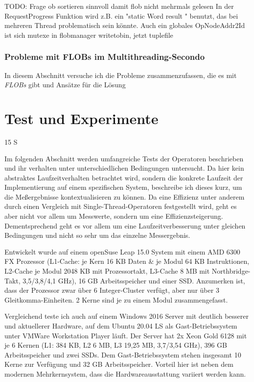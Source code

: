 \documentclass[a4paper,12pt,twoside]{article}
\newcommand{\Fb}[1]{\textit{#1}} %
\begin{document}
TODO: Frage ob sortieren sinnvoll damit flob nicht mehrmals gelesen
In der RequestProgress Funktion wird z.B. ein "static Word result " benutzt, das bei mehreren Thread problematisch sein könnte. 
Auch ein globales OpNodeAddr2Id ist sich
mutexe in flobmanager
writetobin, jetzt tuplefile

\subsubsection{Probleme mit FLOBs im Multithreading-Secondo}

In diesem Abschnitt versuche ich die Probleme zusammenzufassen, die es mit \Fb{FLOBs} gibt und Ansätze für die Lösung 

\section{Test und Experimente} 15 S

Im folgenden Abschnitt werden umfangreiche Tests der Operatoren beschrieben und ihr verhalten unter unterschiedlichen Bedingungen untersucht. Da hier kein abstraktes Laufzeitverhalten betrachtet wird, sondern die konkrete Laufzeit der Implementierung auf einem spezifischen System, beschreibe ich dieses kurz, um die Meßergebnisse kontextualisieren zu können. Da eine Effizienz unter anderem durch einen Vergleich mit Single-Thread-Operatoren festgestellt wird, geht es aber nicht vor allem um Messwerte, sondern um eine Effizienzsteigerung. Dementsprechend geht es vor allem um eine Laufzeitverbesserung unter gleichen Bedingungen und nicht so sehr um das einzelne Messergebnis.

Entwickelt wurde auf einem openSuse Leap 15.0 System mit einem AMD 6300 FX Prozessor (L1-Cache: je Kern 16 KB Daten \& je Modul 64 KB Instruktionen, L2-Cache je Modul 2048 KB mit Prozessortakt, L3-Cache 8 MB mit Northbridge-Takt, 3,5/3,8/4,1 GHz), 16 GB Arbeitsspeicher und einer SSD. Anzumerken ist, dass der Prozessor zwar über
6 Integer-Cluster verfügt, aber nur über 3 Gleitkomma-Einheiten. 2 Kerne sind je zu einem Modul zusammengefasst.

Vergleichend teste ich auch auf einem Windows 2016 Server mit deutlich besserer und aktuellerer Hardware, auf dem Ubuntu 20.04 LS als Gast-Betriebssystem unter VMWare Workstation Player läuft. Der Server hat 2x Xeon Gold 6128 mit je 6 Kernen (L1: 384 KB, L2 6 MB, L3 19,25 MB, 3,7/3,54 GHz), 396 GB Arbeitsspeicher und zwei SSDs. Dem Gast-Betriebssystem stehen insgesamt 10 Kerne zur Verfügung und 32 GB Arbeitsspeicher. Vorteil hier ist neben dem modernen Mehrkernsystem, dass die Hardwareausstattung variiert werden kann.  
\end{document}

